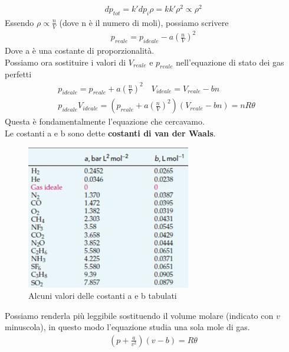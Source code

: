 \documentclass[
10pt, %
a4paper, %
oneside, %
headinclude,footinclude, %
BCOR5mm, %
]{scrartcl}
\begin{document}
\begin{align*} 
	dp_{tot} = k'dp_i\rho  = kk' \rho^2 \propto \rho^2
\end{align*} 
Essendo $\rho \propto \frac{n}{V}$ (dove n è il numero di moli), possiamo scrivere
\begin{align*} 
	p_{reale} = p_{ideale}- a  \left(\frac{n}{V}\right)^2
\end{align*} 
Dove a è una costante di proporzionalità.\\
Possiamo ora sostituire i valori di $V_{reale}$ e $p_{reale}$ nell'equazione di stato dei gas perfetti
\begin{align*} 
	& p_{ideale} = p_{reale} + a \left(\frac{n}{V}\right)^2 \quad V_{ideale} = V_{reale} - b n\\
	& p_{ideale} V_{ideale} = \left(p_{reale} + a \left(\frac{n}{V}\right)^2 \right) \left( V_{reale} - b n \right) = n R \theta 
\end{align*} 
Questa è fondamentalmente l'equazione che cercavamo.\\
Le costanti a e b sono dette \textbf{costanti di van der Waals}.
\begin{figure}[h!]
	\centering
	\includegraphics[width=0.5\linewidth]{../images/costantiaeb}
	\caption{Alcuni valori delle costanti a e b tabulati}
	\label{fig:costantiaeb}
\end{figure}
\FloatBarrier
Possiamo renderla più leggibile sostituendo il volume molare (indicato con $v$ minuscola), in questo modo l'equazione studia una sola mole di gas.  
\begin{align*} 
	\left( p + \frac{a}{v^2}\right)\left(v-b\right) = R \theta
\end{align*} 
\end{document}
